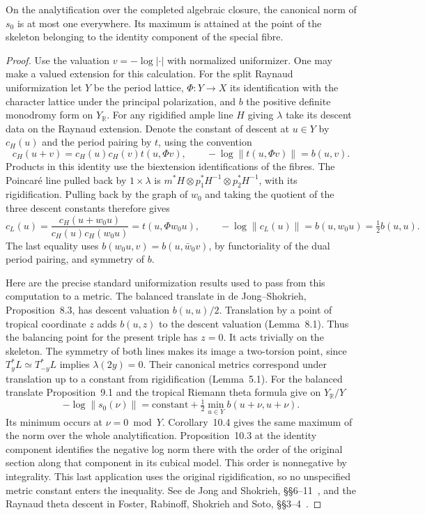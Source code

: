 \begin{lemma}\label{intjet:maximum}
On the analytification over the completed algebraic closure, the
canonical norm of \(s_0\) is at most one everywhere. Its maximum
is attained at the point of the skeleton belonging to the identity
component of the special fibre.
\end{lemma}
\begin{proof}
Use the valuation \(v=-\log|\cdot|\) with normalized uniformizer.
One may make a valued extension for this calculation. For the split
Raynaud uniformization let \(Y\) be the period lattice,
\(\Phi:Y\longrightarrow X\) its identification with the character
lattice under the principal polarization, and \(b\) the positive
definite monodromy form on \(Y_{\mathbb R}\).
For any rigidified ample line \(H\) giving \(\lambda\) take its
descent data on the Raynaud extension. Denote the constant of descent
at \(u\in Y\) by \(c_H(u)\) and the period pairing by \(t\), using
the convention
\[
 c_H(u+v)=c_H(u)c_H(v)t(u,\Phi v),\qquad
 -\log\|t(u,\Phi v)\|=b(u,v).
\]
Products in this identity use the biextension identifications of
the fibres. The Poincaré line pulled back by \(1\times\lambda\)
is \(m^*H\otimes p_1^*H^{-1}\otimes p_2^*H^{-1}\), with its
rigidification. Pulling back by the graph of \(w_0\) and taking
the quotient of the three descent constants therefore gives
\[
 c_L(u)=\frac{c_H(u+w_0u)}{c_H(u)c_H(w_0u)}
       =t(u,\Phi w_0u),\qquad
 -\log\|c_L(u)\|=b(u,w_0u)=\tfrac12 b(u,u).
\]
The last equality uses \(b(w_0u,v)=b(u,\bar w_0v)\), by functoriality
of the dual period pairing, and symmetry of \(b\).

Here are the precise standard uniformization results used to pass
from this computation to a metric. The balanced translate in
de Jong--Shokrieh, Proposition~8.3, has descent valuation
\(b(u,u)/2\). Translation by a point of tropical coordinate \(z\)
adds \(b(u,z)\) to the descent valuation (Lemma~8.1).
Thus the balancing point for the present triple has \(z=0\).
It acts trivially on the skeleton. The symmetry of both lines makes
its image a two-torsion point, since \(T_y^*L\simeq T_{-y}^*L\)
implies \(\lambda(2y)=0\). Their canonical metrics correspond under
translation up to a constant from rigidification (Lemma~5.1).
For the balanced translate Proposition~9.1 and the tropical
Riemann theta formula give on \(Y_{\mathbb R}/Y\)
\[
        -\log\|s_0(\nu)\|=\mathrm{constant}
                      +\tfrac12\min_{u\in Y} b(u+\nu,u+\nu).
\]
Its minimum occurs at \(\nu=0\bmod Y\). Corollary~10.4 gives
the same maximum of the norm over the whole analytification.
Proposition~10.3 at the identity component identifies the negative
log norm there with the order of the original section along that
component in its cubical model. This order is nonnegative by
integrality. This last application uses the original rigidification,
so no unspecified metric constant enters the inequality.
See de Jong and Shokrieh, \S\S6--11~\cite{deJongShokrieh}, and the
Raynaud theta descent in Foster, Rabinoff, Shokrieh and Soto,
\S\S3--4~\cite{fosterTheta}.
\end{proof}

